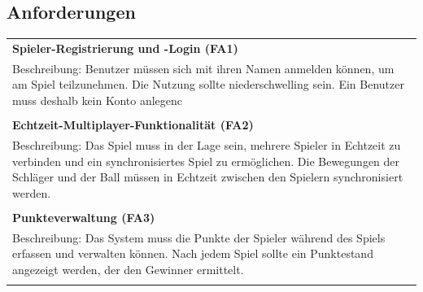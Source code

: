 \documentclass[
]{article}
\begin{document}
\subsection{Anforderungen}
\begin{center}
  \begin{tabular}{|p{\linewidth}|}
    \hline
    \textbf{Spieler-Registrierung und -Login (FA1)} \\
    Beschreibung: Benutzer müssen sich mit ihren Namen anmelden können, um am Spiel teilzunehmen.
    Die Nutzung sollte niederschwelling sein. Ein Benutzer muss deshalb kein Konto anlegenc \\ \\
    \hline
    \textbf{Echtzeit-Multiplayer-Funktionalität (FA2)} \\
    Beschreibung: Das Spiel muss in der Lage sein, mehrere Spieler in Echtzeit zu verbinden und ein synchronisiertes Spiel zu ermöglichen. Die Bewegungen der Schläger und der Ball müssen in Echtzeit zwischen den Spielern synchronisiert werden.\\ \\
    \hline
    \textbf{Punkteverwaltung (FA3)} \\
    Beschreibung: Das System muss die Punkte der Spieler während des Spiels erfassen und verwalten können. Nach jedem Spiel sollte ein Punktestand angezeigt werden, der den Gewinner ermittelt. \\ \\
    \hline
  \end{tabular}
\end{center}
\end{document}
